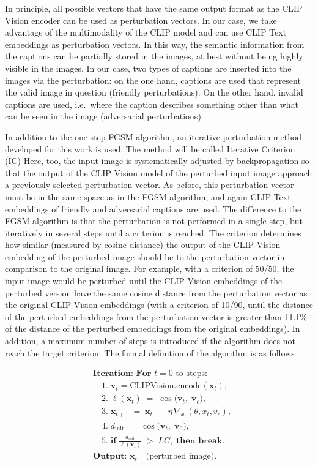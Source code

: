 In principle, all possible vectors that have the same output format as the CLIP Vision encoder can be used as perturbation vectors. In our case, we take advantage of the multimodality of the CLIP model and can use CLIP Text embeddings as perturbation vectors. In this way, the semantic information from the captions can be partially stored in the images, at best without being highly visible in the images. In our case, two types of captions are inserted into the images via the perturbation: on the one hand, captions are used that represent the valid image in question (friendly perturbations). On the other hand, invalid captions are used, i.e.\ where the caption describes something other than what can be seen in the image (adversarial perturbations). 

In addition to the one-step FGSM algorithm, an iterative perturbation method developed for this work is used. The method will be called Iterative Criterion (IC) Here, too, the input image is systematically adjusted by backpropagation so that the output of the CLIP Vision model of the perturbed input image approach a previously selected perturbation vector. As before, this perturbation vector must be in the same space as in the FGSM algorithm, and again CLIP Text embeddings of friendly and adversarial captions are used. The difference to the FGSM algorithm is that the perturbation is not performed in a single step, but iteratively in several steps until a criterion is reached. The criterion determines how similar (measured by cosine distance) the output of the CLIP Vision embedding of the perturbed image should be to the perturbation vector in comparison to the original image. For example, with a criterion of 50/50, the input image would be perturbed until the CLIP Vision embeddings of the perturbed version have the same cosine distance from the perturbation vector as the original CLIP Vision embeddings (with a criterion of 10/90, until the distance of the perturbed embeddings from the perturbation vector is greater than 11.1\% of the distance of the perturbed embeddings from the original embeddings). In addition, a maximum number of steps is introduced if the algorithm does not reach the target criterion. The formal definition of the algorithm is as follows 

\[
\begin{aligned}
& \textbf{Iteration: For } t = 0 \text{ to steps:}\\
& \quad 1.\; \mathbf{v}_t = \mathrm{CLIP Vision.encode}(\mathbf{x}_t), \\[4pt]
& \quad 2.\; \ell(\mathbf{x}_t) 
\;=\; \cos\bigl(\mathbf{v}_t,\;\mathbf{v}_c\bigr), \\[4pt]
& \quad 3.\; \mathbf{x}_{t+1} 
\;=\; \mathbf{x}_t \;-\; \eta \,\nabla_{x_t} (\theta, x_t, v_c), \\[4pt]
& \quad 4.\; d_{\text{init}} 
\;=\; \cos\bigl(\mathbf{v}_t,\;\mathbf{v}_0\bigr), \\[4pt]
& \quad 5.\; \textbf{if} \;\frac{d_{\text{init}}}{\ell(\mathbf{x}_t)} 
\;>\; LC, \;\textbf{then break}.\\[6pt]
%
& \textbf{Output: } \mathbf{x}_t \quad \text{(perturbed image)}.
\end{aligned}
\]

